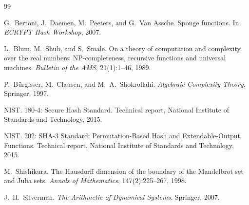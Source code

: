 \documentclass[11pt]{article}
\theoremstyle{definition}
\theoremstyle{remark}
\begin{document}

\begin{thebibliography}{99}

G.~Bertoni, J.~Daemen, M.~Peeters, and G.~Van Assche.
\newblock Sponge functions.
\newblock In \emph{ECRYPT Hash Workshop}, 2007.

L.~Blum, M.~Shub, and S.~Smale.
\newblock On a theory of computation and complexity over the real numbers:
  {NP}-completeness, recursive functions and universal machines.
\newblock \emph{Bulletin of the AMS}, 21(1):1--46, 1989.

P.~B\"urgisser, M.~Clausen, and M.~A.~Shokrollahi.
\newblock \emph{Algebraic Complexity Theory}.
\newblock Springer, 1997.

{NIST}.
 180-4: {Secure Hash Standard}.
\newblock Technical report, National Institute of Standards and Technology,
  2015.

{NIST}.
 202: {SHA-3 Standard}: Permutation-Based Hash and
  Extendable-Output Functions.
\newblock Technical report, National Institute of Standards and Technology,
  2015.

M.~Shishikura.
\newblock The {H}ausdorff dimension of the boundary of the {M}andelbrot set
  and {J}ulia sets.
\newblock \emph{Annals of Mathematics}, 147(2):225--267, 1998.

J.~H.~Silverman.
\newblock \emph{The Arithmetic of Dynamical Systems}.
\newblock Springer, 2007.

\end{thebibliography}
\end{document}
